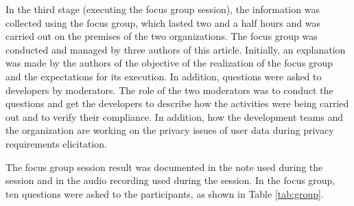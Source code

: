\documentclass[conference]{IEEEtran}
\begin{document}

In the third stage (executing the focus group session), the information was collected using the focus group, which lasted two and a half hours and was carried out on the premises of the two organizations. The focus group was conducted and managed by three authors of this article. Initially, an explanation was made by the authors of the objective of the realization of the focus group and the expectations for its execution. In addition, questions were asked to developers by moderators. The role of the two moderators was to conduct the questions and get the developers to describe how the activities were being carried out and to verify their compliance. In addition, how the development teams and the organization are working on the privacy issues of user data during privacy requirements elicitation.


The focus group session result was documented in the note used during the session and in the audio recording used during the session. In the focus group, ten questions were asked to the participants, as shown in Table \ref{tab:group}.
\end{document}
